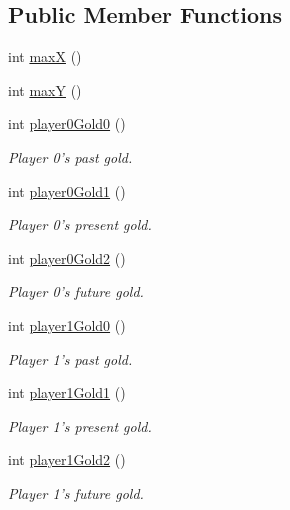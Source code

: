\subsection*{Public Member Functions}
\begin{CompactItemize}
\item 
int \hyperlink{classBaseAI_e7574c0a95bc4431f83078c0074b1eec}{maxX} ()
\item 
int \hyperlink{classBaseAI_68f5dfd6450be2649c8c26481ba7c0a5}{maxY} ()
\item 
int \hyperlink{classBaseAI_e350c70cf7c368175a418a8fd8c29eba}{player0Gold0} ()
\begin{CompactList}\small\item\em Player 0's past gold. \item\end{CompactList}\item 
int \hyperlink{classBaseAI_55de649fba1edb2c8a316070a4041f16}{player0Gold1} ()
\begin{CompactList}\small\item\em Player 0's present gold. \item\end{CompactList}\item 
int \hyperlink{classBaseAI_5ea60d2c86f1e4457bef7963a3d0afce}{player0Gold2} ()
\begin{CompactList}\small\item\em Player 0's future gold. \item\end{CompactList}\item 
int \hyperlink{classBaseAI_f82cc7bd092d0636eb8a8df82a0c5b49}{player1Gold0} ()
\begin{CompactList}\small\item\em Player 1's past gold. \item\end{CompactList}\item 
int \hyperlink{classBaseAI_cc09926bd744fdf9ec4448366d8b8de7}{player1Gold1} ()
\begin{CompactList}\small\item\em Player 1's present gold. \item\end{CompactList}\item 
int \hyperlink{classBaseAI_35bad13d289478aa2bb628d6e3c56c52}{player1Gold2} ()
\begin{CompactList}\small\item\em Player 1's future gold. \item\end{CompactList}\item 

\end{CompactItemize}
